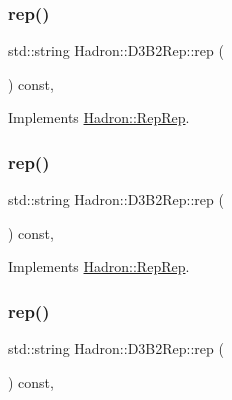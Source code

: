\subsubsection{\texorpdfstring{rep()}{rep()}\hspace{0.1cm}{\footnotesize\ttfamily [3/5]}}
{\footnotesize\ttfamily std\+::string Hadron\+::\+D3\+B2\+Rep\+::rep (\begin{DoxyParamCaption}{ }\end{DoxyParamCaption}) const\hspace{0.3cm}{\ttfamily [inline]}, {\ttfamily [virtual]}}



Implements \mbox{\hyperlink{structHadron_1_1RepRep_ab3213025f6de249f7095892109575fde}{Hadron\+::\+Rep\+Rep}}.

\mbox{\label{structHadron_1_1D3B2Rep_abcd797a15df29cb4a68037442daaf3d5}} 
\subsubsection{\texorpdfstring{rep()}{rep()}\hspace{0.1cm}{\footnotesize\ttfamily [4/5]}}
{\footnotesize\ttfamily std\+::string Hadron\+::\+D3\+B2\+Rep\+::rep (\begin{DoxyParamCaption}{ }\end{DoxyParamCaption}) const\hspace{0.3cm}{\ttfamily [inline]}, {\ttfamily [virtual]}}



Implements \mbox{\hyperlink{structHadron_1_1RepRep_ab3213025f6de249f7095892109575fde}{Hadron\+::\+Rep\+Rep}}.

\mbox{\label{structHadron_1_1D3B2Rep_abcd797a15df29cb4a68037442daaf3d5}} 
\subsubsection{\texorpdfstring{rep()}{rep()}\hspace{0.1cm}{\footnotesize\ttfamily [5/5]}}
{\footnotesize\ttfamily std\+::string Hadron\+::\+D3\+B2\+Rep\+::rep (\begin{DoxyParamCaption}{ }\end{DoxyParamCaption}) const\hspace{0.3cm}{\ttfamily [inline]}, {\ttfamily [virtual]}}



